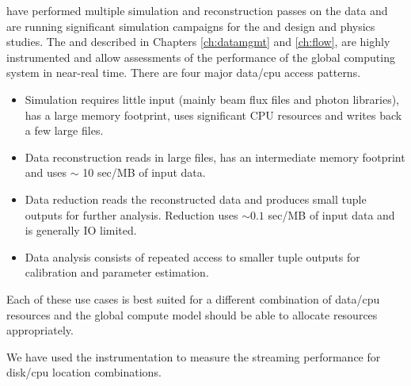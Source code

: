 \documentclass[../main-v1.tex]{subfiles}
\begin{document}
 have performed multiple simulation and reconstruction passes on the  data and are running significant simulation campaigns for the  and  design and physics studies. The  and  described in Chapters \ref{ch:datamgmt} and \ref{ch:flow}, are highly instrumented and allow assessments of the performance of the global computing system in near-real time.  There are four major data/cpu access patterns.
\begin{itemize}
    \item Simulation requires little input (mainly beam flux files and photon libraries),  has a large memory footprint, uses significant CPU resources and writes back a few large files.
    \item Data reconstruction reads in large files, has an intermediate memory footprint and uses $\sim$ 10 sec/MB of input data.  
    \item Data reduction reads the reconstructed data and produces small tuple outputs for further analysis.  Reduction uses $\sim 0.1$ sec/MB of input data and is generally IO limited.
    \item Data analysis consists of repeated access to smaller tuple outputs for calibration and parameter estimation.
\end{itemize}

Each of these use cases is best suited for a different combination of data/cpu resources and the global compute model should be able to allocate resources appropriately.  

We have used the  instrumentation to measure the  streaming performance for disk/cpu location combinations. 
\end{document}
